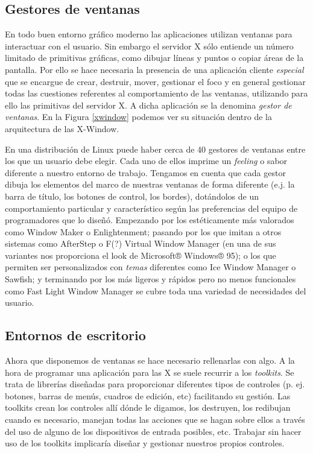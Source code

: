 \subsection{Gestores de ventanas}

En  todo  buen  entorno  gráfico  moderno  las  aplicaciones  utilizan
ventanas para interactuar con el usuario. Sin embargo el servidor {\sf
X}  sólo entiende  un  número limitado  de  primitivas gráficas,  como
dibujar  líneas y  puntos  o copiar  áreas de  la  pantalla. Por  ello
se  hace  necesaria  la  presencia  de  una  aplicación  cliente  {\em
especial}  que se  encargue de  crear, destruir,  mover, gestionar  el
foco  y  en  general  gestionar todas  las  cuestiones  referentes  al
comportamiento de  las ventanas,  utilizando para ello  las primitivas
del servidor  {\sf X}. A dicha  aplicación se la denomina  {\em gestor
de  ventanas}. En  la Figura  \ref{xwindow}
podemos  ver  su situación  dentro  de  la  arquitectura de  las  {\sf
X-Window}.

En una  distribución de  Linux puede  haber cerca  de  40  gestores de
ventanas  entre los  que un  usuario debe  elegir. Cada  uno de  ellos
imprime  un {\em  feeling}  o  sabor diferente  a  nuestro entorno  de
trabajo. Tengamos en  cuenta que cada gestor dibuja  los elementos del
marco  de nuestras  ventanas  de  forma diferente  (e.j.  la barra  de
título,  los  botones  de  control,  los  bordes),  dotándolos  de  un
comportamiento particular y característico  según las preferencias del
equipo de programadores que lo diseñó. Empezando por los estéticamente
más valorados como  {\sf Window Maker} o  {\sf Enlightenment}; pasando
por los que  imitan a otros sistemas como {\sf  AfterStep} o {\sf F(?)
Virtual Window  Manager} (en una  de sus variantes nos  proporciona el
look de Microsoft® Windows® 95); o los que permiten ser personalizados
con  {\em temas}  diferentes  como  {\sf Ice  Window  Manager} o  {\sf
Sawfish}; y  terminando por los  más ligeros  y rápidos pero  no menos
funcionales como  {\sf Fast  Light Window Manager}  se cubre  toda una
variedad de necesidades del usuario.

\subsection{Entornos de escritorio}

Ahora que  disponemos de  ventanas se  hace necesario  rellenarlas con
algo. A la hora de programar una  aplicación para las {\sf X} se suele
recurrir a  los {\em toolkits}. Se  trata de librerías
diseñadas  para proporcionar  diferentes  tipos de  controles (p.  ej.
botones,  barras de  menús, cuadros  de edición,  etc) facilitando  su
gestión. Las toolkits  crean los controles allí dónde  le digamos, los
destruyen,  los  redibujan  cuando  es necesario,  manejan  todas  las
acciones que se  hagan sobre ellos a  través del uso de  alguno de los
dispositivos de entrada  posibles, etc. Trabajar sin hacer  uso de los
toolkits implicaría diseñar y gestionar nuestros propios controles.

